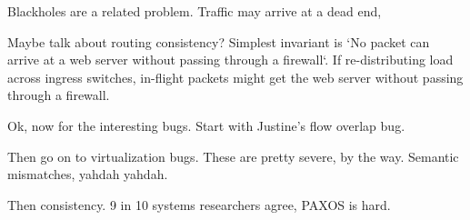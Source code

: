 Blackholes are a related problem. Traffic may arrive at a dead end,

Maybe talk about routing consistency? Simplest invariant is `No packet can
arrive at a web server without passing through a firewall`. If re-distributing
load across ingress switches, in-flight packets might get the web server
without passing through a firewall.

Ok, now for the interesting bugs. Start with Justine's flow overlap bug.

Then go on to virtualization bugs. These are pretty severe, by the way.
Semantic mismatches, yahdah yahdah.

Then consistency. 9 in 10 systems researchers agree, PAXOS is hard.

